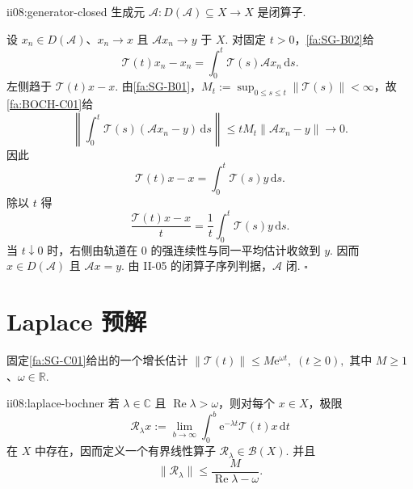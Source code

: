 \begin{FAProposition}[A][生成元闭性]{ii08:generator-closed}
生成元 \(\displaystyle\mathcal A:D(\mathcal A)\subseteq X\to X\) 是闭算子.
\end{FAProposition}

\begin{FAProof}
设 \(\displaystyle x_n\in D(\mathcal A)\)、\(\displaystyle x_n\to x\) 且 \(\displaystyle\mathcal Ax_n\to y\) 于 \(\displaystyle X\). 对固定 \(\displaystyle t>0\)，\autoref{fa:SG-B02}给
\[
\mathcal T(t)x_n-x_n
=
\int_0^t\mathcal T(s)\mathcal Ax_n\,\mathrm{d}s.
\]
左侧趋于 \(\displaystyle\mathcal T(t)x-x\). 由\autoref{fa:SG-B01}，\(\displaystyle M_t:=\sup_{0\leqslant s\leqslant t}\|\mathcal T(s)\|<\infty\)，故\autoref{fa:BOCH-C01}给
\[
\left\|
\int_0^t\mathcal T(s)(\mathcal Ax_n-y)\,\mathrm{d}s
\right\|
\leqslant
tM_t\|\mathcal Ax_n-y\|
\longrightarrow0.
\]
因此
\[
\mathcal T(t)x-x
=
\int_0^t\mathcal T(s)y\,\mathrm{d}s.
\]
除以 \(\displaystyle t\) 得
\[
\frac{\mathcal T(t)x-x}{t}
=
\frac1t\int_0^t\mathcal T(s)y\,\mathrm{d}s.
\]
当 \(\displaystyle t\downarrow0\) 时，右侧由轨道在 \(\displaystyle0\) 的强连续性与同一平均估计收敛到 \(\displaystyle y\). 因而 \(\displaystyle x\in D(\mathcal A)\) 且 \(\displaystyle\mathcal Ax=y\). 由 II-05 的闭算子序列判据，\(\displaystyle\mathcal A\) 闭.
\hfill\(\square\)
\end{FAProof}

\section{Laplace 预解}\label{sec:ii08-laplace-resolvent}

固定\autoref{fa:SG-C01}给出的一个增长估计
\(\displaystyle \|\mathcal T(t)\| \leqslant M\mathrm{e}^{\omega t} ,\; (t\geqslant0),\)
其中 \(\displaystyle M\geqslant1\)、\(\displaystyle\omega\in\mathbb R\).

\begin{FAProposition}{ii08:laplace-bochner}
若 \(\displaystyle\lambda\in\mathbb C\) 且 \(\displaystyle\operatorname{Re}\lambda>\omega\)，则对每个 \(\displaystyle x\in X\)，极限
\[
\mathcal R_\lambda x
:=
\lim_{b\to\infty}
\int_0^b
\mathrm{e}^{-\lambda t}\mathcal T(t)x\,\mathrm{d}t
\]
在 \(\displaystyle X\) 中存在，因而定义一个有界线性算子 \(\displaystyle\mathcal R_\lambda\in\mathcal B(X)\). 并且
\[
\|\mathcal R_\lambda\|
\leqslant
\frac{M}{\operatorname{Re}\lambda-\omega}.
\]
\end{FAProposition}

